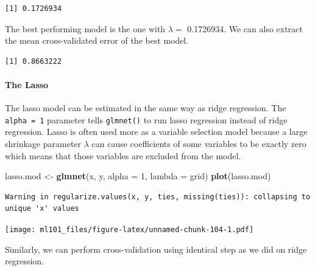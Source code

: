 \documentclass[]{article}
\newenvironment{Shaded}{\begin{snugshade}}{\end{snugshade}}
\newcommand{\DataTypeTok}[1]{\textcolor[rgb]{0.13,0.29,0.53}{#1}}
\newcommand{\DecValTok}[1]{\textcolor[rgb]{0.00,0.00,0.81}{#1}}
\newcommand{\KeywordTok}[1]{\textcolor[rgb]{0.13,0.29,0.53}{\textbf{#1}}}
\newcommand{\NormalTok}[1]{#1}
\newcommand{\OperatorTok}[1]{\textcolor[rgb]{0.81,0.36,0.00}{\textbf{#1}}}
\newcommand{\StringTok}[1]{\textcolor[rgb]{0.31,0.60,0.02}{#1}}
\let\oldparagraph\paragraph
\renewcommand{\paragraph}[1]{\oldparagraph{#1}\mbox{}}
\begin{document}
\begin{verbatim}
[1] 0.1726934
\end{verbatim}

The best performing model is the one with \(\lambda =\) 0.1726934. We can also extract the mean cross-validated error of the best model.

\begin{Shaded}
\end{Shaded}

\begin{verbatim}
[1] 0.8663222
\end{verbatim}

\hypertarget{the-lasso}{%
\paragraph{The Lasso}\label{the-lasso}}

The lasso model can be estimated in the same way as ridge regression. The \texttt{alpha\ =\ 1} parameter tells \texttt{glmnet()} to run lasso regression instead of ridge regression. Lasso is often used more as a variable selection model because a large shrinkage parameter \(\lambda\) can cause coefficients of some variables to be exactly zero which means that those variables are excluded from the model.

\begin{Shaded}
\begin{Highlighting}[]
\NormalTok{lasso.mod <-}\StringTok{ }\KeywordTok{glmnet}\NormalTok{(x, y, }\DataTypeTok{alpha =} \DecValTok{1}\NormalTok{, }\DataTypeTok{lambda =}\NormalTok{ grid)}
\KeywordTok{plot}\NormalTok{(lasso.mod)}
\end{Highlighting}
\end{Shaded}

\begin{verbatim}
Warning in regularize.values(x, y, ties, missing(ties)): collapsing to
unique 'x' values
\end{verbatim}

\texttt{[image: ml101\_files/figure-latex/unnamed-chunk-104-1.pdf]}

Similarly, we can perform cross-validation using identical step as we did on ridge regression.
\end{document}
